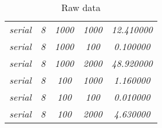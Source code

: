 \documentclass[../main.tex]{subfiles}
\begin{document}
\begin{table}[]
\begin{tabular}{|c|c|c|c|c|}
\textit{serial}  & \textit{8}       & \textit{1000}   & \textit{1000} & \textit{12.410000}   \\
\textit{serial}  & \textit{8}       & \textit{1000}   & \textit{100}  & \textit{0.100000}    \\
\textit{serial}  & \textit{8}       & \textit{1000}   & \textit{2000} & \textit{48.920000}   \\
\textit{serial}  & \textit{8}       & \textit{100}    & \textit{1000} & \textit{1.160000}    \\
\textit{serial}  & \textit{8}       & \textit{100}    & \textit{100}  & \textit{0.010000}    \\
\textit{serial}  & \textit{8}       & \textit{100}    & \textit{2000} & \textit{4.630000}    \\ \hline
\end{tabular}
\caption{Raw data}
\end{table}
\end{document}
